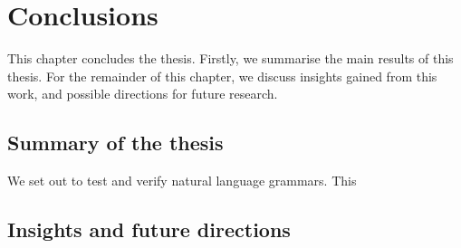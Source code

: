 \chapter{Conclusions}
\label{chapterConclusions}


This chapter concludes the thesis.
Firstly, we summarise the main results of this thesis.
For the remainder of this chapter, we discuss insights gained from this work, and possible directions for future research.

\section{Summary of the thesis}

We set out to test and verify natural language grammars.
This 


\section{Insights and future directions}


